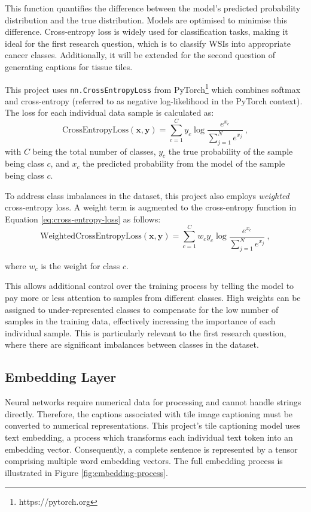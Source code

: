 \documentclass{l4proj}
\begin{document}
This function quantifies the difference between the model's predicted probability distribution and the true distribution. Models are optimised to minimise this difference. Cross-entropy loss is widely used for classification tasks, making it ideal for the first research question, which is to classify WSIs into appropriate cancer classes. Additionally, it will be extended for the second question of generating captions for tissue tiles.

This project uses \verb|nn.CrossEntropyLoss| from PyTorch\footnote{https://pytorch.org} which combines softmax and cross-entropy (referred to as negative log-likelihood in the PyTorch context). The loss for each individual data sample is calculated as:
\begin{equation}\label{eq:cross-entropy-loss}
    \text{CrossEntropyLoss}(\boldsymbol{x}, \boldsymbol{y}) = \sum_{c=1}^C y_{c} \log \frac{e^{x_c}}{\sum\limits^{N}_{j=1}e^{x_j}}\ ,
\end{equation}
with $C$ being the total number of classes, $y_c$ the true probability of the sample being class $c$, and $x_c$ the predicted probability from the model of the sample being class $c$.

To address class imbalances in the dataset, this project also employs \emph{weighted} cross-entropy loss. A weight term is augmented to the cross-entropy function in Equation \ref{eq:cross-entropy-loss} as follows:
\begin{equation}
    \text{WeightedCrossEntropyLoss}(\boldsymbol{x}, \boldsymbol{y}) = \sum_{c=1}^C w_c y_{c} \log \frac{e^{x_c}}{\sum\limits^{N}_{j=1}e^{x_j}}\ ,
\end{equation}

where $w_c$ is the weight for class $c$.

This allows additional control over the training process by telling the model to pay more or less attention to samples from different classes. High weights can be assigned to under-represented classes to compensate for the low number of samples in the training data, effectively increasing the importance of each individual sample. This is particularly relevant to the first research question, where there are significant imbalances between classes in the dataset.


\subsection{Embedding Layer} \label{sec:embedding-layer}
Neural networks require numerical data for processing and cannot handle strings directly. Therefore, the captions associated with tile image captioning must be converted to numerical representations. This project's tile captioning model uses text embedding, a process which transforms each individual text token into an embedding vector. Consequently, a complete sentence is represented by a tensor comprising multiple word embedding vectors. The full embedding process is illustrated in Figure \ref{fig:embedding-process}. 
\end{document}

